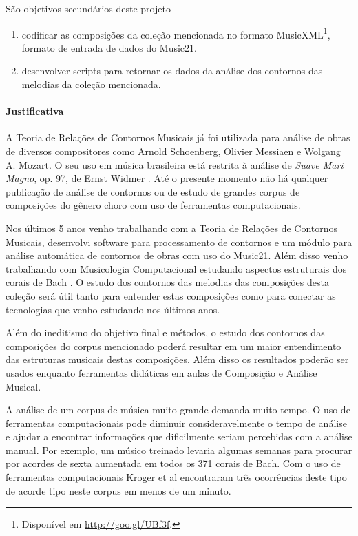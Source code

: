 \documentclass[11pt]{article}
\newcommand{\opus}[1]{\textit{#1}}
\begin{document}
São objetivos secundários deste projeto
\begin{enumerate}
\item codificar as composições da coleção mencionada no formato
  MusicXML\footnote{Disponível em \url{http://goo.gl/UBf3f}.}, formato
  de entrada de dados do Music21.
\item desenvolver scripts para retornar os dados da análise dos
  contornos das melodias da coleção mencionada.
\end{enumerate}

\paragraph{Justificativa}
\label{sec:justificativa}

A Teoria de Relações de Contornos Musicais já foi utilizada para
análise de obras de diversos compositores como Arnold Schoenberg,
Olivier Messiaen e Wolgang A. Mozart. O seu uso em música brasileira
está restrita à análise de \opus{Suave Mari Magno}, op. 97, de Ernst
Widmer \cite{Thiesen2005}. Até o presente momento não há qualquer
publicação de análise de contornos ou de estudo de grandes corpus de
composições do gênero choro com uso de ferramentas computacionais.

Nos últimos 5 anos venho trabalhando com a Teoria de Relações de
Contornos Musicais, desenvolvi software para processamento de
contornos e um módulo para análise automática de contornos de obras
com uso do Music21.
Além disso venho trabalhando com Musicologia Computacional estudando
aspectos estruturais dos corais de Bach \cite{Kroger2008}. O estudo
dos contornos das melodias das composições desta coleção será útil
tanto para entender estas composições como para conectar as
tecnologias que venho estudando nos últimos anos.

Além do ineditismo do objetivo final e métodos, o estudo dos contornos
das composições do corpus mencionado poderá resultar em um maior
entendimento das estruturas musicais destas composições. Além disso os
resultados poderão ser usados enquanto ferramentas didáticas em aulas
de Composição e Análise Musical.


A análise de um corpus de música muito grande demanda muito tempo. O
uso de ferramentas computacionais pode diminuir consideravelmente o
tempo de análise e ajudar a encontrar informações que dificilmente
seriam percebidas com a análise manual. Por exemplo, um músico
treinado levaria algumas semanas para procurar por acordes de sexta
aumentada em todos os 371 corais de Bach. Com o uso de ferramentas
computacionais Kroger et al \cite{Kroger2008} encontraram três
ocorrências deste tipo de acorde tipo neste corpus em menos de um
minuto.
\end{document}
